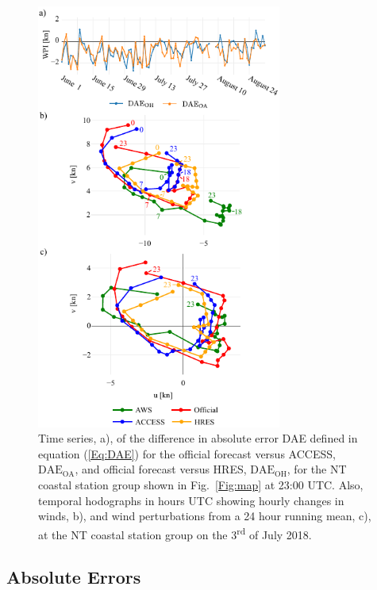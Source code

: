 \documentclass{ametsoc}
\begin{document}
\begin{figure}
\centering
\includegraphics[width=19pc]{case_studies_nt.pdf}
\caption{Time series, a), of the difference in absolute error DAE defined in equation (\ref{Eq:DAE}) for the official forecast versus ACCESS, $\text{DAE}_\text{OA}$, and official forecast versus HRES, $\text{DAE}_\text{OH}$, for the NT coastal station group shown in Fig.~\ref{Fig:map} at 23:00 UTC. Also, temporal hodographs in hours UTC showing hourly changes in winds, b), and wind perturbations from a 24 hour running mean, c), at the NT coastal station group on the 3\textsuperscript{rd} of July 2018.}
\label{Fig:case_studies_nt}
\end{figure}

\subsection{Absolute Errors}
\label{Sec:Daily}
\end{document}
